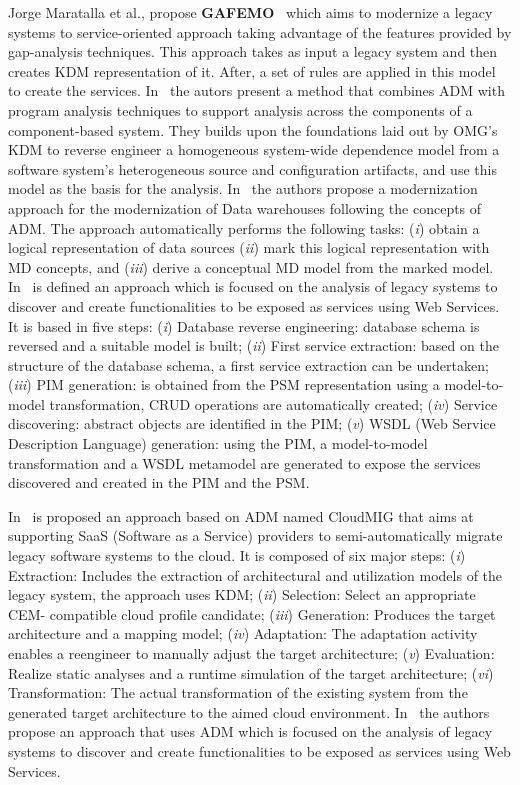  Jorge Maratalla et al., propose \textbf{GAFEMO}~\cite{6311013} which aims to modernize a legacy systems to service-oriented approach taking advantage of the features provided by gap-analysis techniques. This approach takes as input a legacy system and then creates KDM representation of it. After, a set of rules are applied in this model to create the services. In~\cite{6080786} the autors present a method that combines ADM with program analysis techniques to support analysis across the components of a component-based system. They builds upon the foundations laid out by OMG's KDM to reverse engineer a homogeneous system-wide dependence model from a software system's heterogeneous source and configuration artifacts, and use this model as the basis for the analysis. In~\cite{Mazon:2007:MDM:1784489.1784497} the authors propose a modernization approach for the modernization of Data warehouses following the concepts of ADM. The approach automatically performs the following tasks: (\textit{i}) obtain a logical representation of data sources (\textit{ii}) mark this logical representation with MD concepts, and (\textit{iii}) derive a conceptual MD model from the marked model. In~\cite{Guzman:2007:AAR:1339262.1339532} is defined an approach which is focused on the analysis of legacy systems to discover and create functionalities to be exposed as services using Web Services. It is based in five steps: (\textit{i}) Database reverse engineering: database schema is reversed and a suitable model is built; (\textit{ii}) First service extraction: based on the structure of the database schema, a first service extraction can be undertaken; (\textit{iii}) PIM generation: is obtained from the PSM representation using a model-to-model transformation, CRUD operations are automatically created; (\textit{iv}) Service discovering: abstract objects are identified in the PIM; (\textit{v}) WSDL (Web Service Description Language) generation: using the PIM, a model-to-model transformation and a WSDL  metamodel are generated to expose the services discovered and created in the PIM and the PSM. 

In~\cite{5741334, SMR:SMR582} is proposed an approach based on ADM named CloudMIG that aims at supporting SaaS (Software as a Service) providers to semi-automatically migrate legacy software systems to the cloud. It is composed of six major steps: (\textit{i}) Extraction: Includes the extraction of architectural and utilization models of the legacy system, the approach uses KDM; (\textit{ii}) Selection: Select an appropriate CEM- compatible cloud profile candidate; (\textit{iii}) Generation: Produces the target architecture and a mapping model; (\textit{iv}) Adaptation: The adaptation activity enables a reengineer to manually adjust the target architecture; (\textit{v}) Evaluation: Realize static analyses and a runtime simulation of the target architecture; (\textit{vi}) Transformation: The actual transformation of the existing system from the generated target architecture to the aimed cloud environment. In~\cite{4400179} the authors propose an approach that uses ADM which is focused on the analysis of legacy systems to discover and create functionalities to be exposed as services using Web Services.

